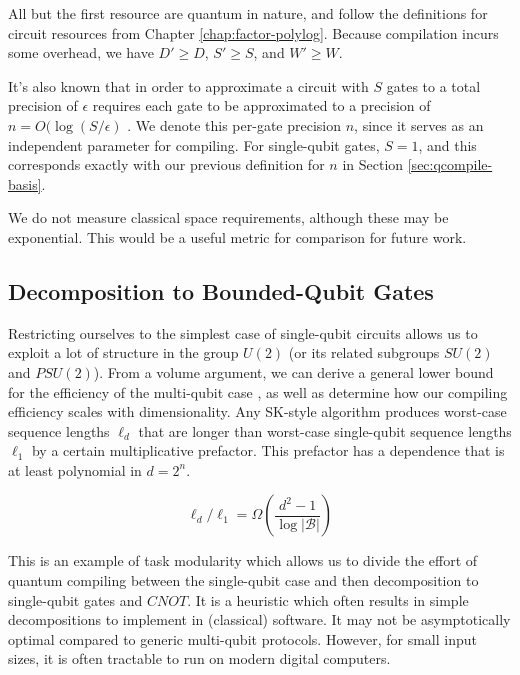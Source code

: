 All but the first resource are quantum in nature, and follow the definitions
for circuit resources from Chapter \ref{chap:factor-polylog}. Because
compilation incurs some overhead, we have $D' \ge D$, $S' \ge S$, and
$W' \ge W$.

It's also known that
in order to approximate a circuit with $S$ gates to a total precision of
$\epsilon$
requires each gate to be approximated to a precision of
$n = O(\log(S/\epsilon)$ \cite{Lloyd1995}. We denote this per-gate precision
$n$, since it serves as an independent parameter for compiling. For
single-qubit gates, $S = 1$, and this corresponds exactly with our previous
definition for $n$ in Section \ref{sec:qcompile-basis}.

We do not measure classical space requirements, although these may be
exponential. This would be a useful metric for comparison for future work.

\subsection{Decomposition to Bounded-Qubit Gates}
\label{subsec:qcompile-multi}

Restricting ourselves to the simplest case of
single-qubit circuits allows us to exploit a lot of structure
in the group $U(2)$ (or its related subgroups $SU(2)$ and $PSU(2)$).
From a volume argument, we can derive a general
lower bound for the efficiency of the multi-qubit case \cite{Harrow2002},
as well as determine how our compiling efficiency scales with dimensionality.
Any
SK-style algorithm produces worst-case sequence lengths $\ell_d$ that
are longer than worst-case single-qubit sequence lengths $\ell_1$ by a certain multiplicative
prefactor. This prefactor has a dependence that is at least
polynomial in $d = 2^n$. 

\begin{equation}
\ell_d / \ell_1 = \Omega \left( \frac{d^2 - 1}{ \log |\mathcal{B}| } \right )
\end{equation}

This is an example of task modularity which allows us
to divide the effort of quantum compiling between the
single-qubit case and then decomposition to single-qubit gates and
$CNOT$. It is a heuristic which often results
in simple decompositions to implement in (classical) software.
It may not be asymptotically optimal compared to generic 
multi-qubit protocols. However, for small input sizes, it is often
tractable to run on modern digital computers.

